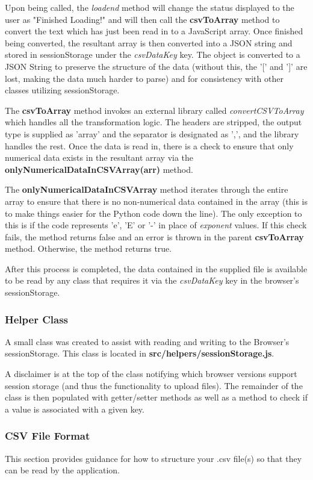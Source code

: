 Upon being called, the {\it loadend} method will change the status displayed to the user as "Finished Loading!" and will then call the {\bf csvToArray} method to convert the text which has just been read in to a JavaScript array. Once finished being converted, the resultant array is then converted into a JSON string and stored in sessionStorage under the {\it csvDataKey} key. The object is converted to a JSON String to preserve the structure of the data (without this, the '[' and ']' are lost, making the data much harder to parse) and for consistency with other classes utilizing sessionStorage.

The {\bf csvToArray} method invokes an external library called {\it convertCSVToArray} which handles all the transformation logic. The headers are stripped, the output type is supplied as 'array' and the separator is designated as ',', and the library handles the rest. Once the data is read in, there is a check to ensure that only numerical data exists in the resultant array via the {\bf onlyNumericalDataInCSVArray(arr)} method.

The {\bf onlyNumericalDataInCSVArray} method iterates through the entire array to ensure that there is no non-numerical data contained in the array (this is to make things easier for the Python code down the line). The only exception to this is if the code represents 'e', 'E' or '-' in place of {\it exponent} values. If this check fails, the method returns false and an error is thrown in the parent {\bf csvToArray} method. Otherwise, the method returns true. 

After this process is completed, the data contained in the supplied file is available to be read by any class that requires it via the {\it csvDataKey} key in the browser's sessionStorage. 

\subsubsection{Helper Class}
A small class was created to assist with reading and writing to the Browser's sessionStorage. This class is located in {\bf src/helpers/sessionStorage.js}.

A disclaimer is at the top of the class notifying which browser versions support session storage (and thus the functionality to upload files). The remainder of the class is then populated with getter/setter methods as well as a method to check if a value is associated with a given key. 

\subsubsection{CSV File Format}
This section provides guidance for how to structure your .csv file(s) so that they can be read by the application. 

